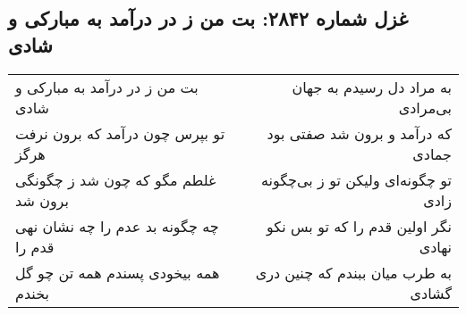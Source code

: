 \begin{center}
\section*{غزل شماره ۲۸۴۲: بت من ز در درآمد به مبارکی و شادی}
\label{sec:2842}
\begin{longtable}{l p{0.5cm} r}
بت من ز در درآمد به مبارکی و شادی
&&
به مراد دل رسیدم به جهان بی‌مرادی
\\
تو بپرس چون درآمد که برون نرفت هرگز
&&
که درآمد و برون شد صفتی بود جمادی
\\
غلطم مگو که چون شد ز چگونگی برون شد
&&
تو چگونه‌ای ولیکن تو ز بی‌چگونه زادی
\\
چه چگونه بد عدم را چه نشان نهی قدم را
&&
نگر اولین قدم را که تو بس نکو نهادی
\\
همه بیخودی پسندم همه تن چو گل بخندم
&&
به طرب میان ببندم که چنین دری گشادی
\\
\end{longtable}
\end{center}
